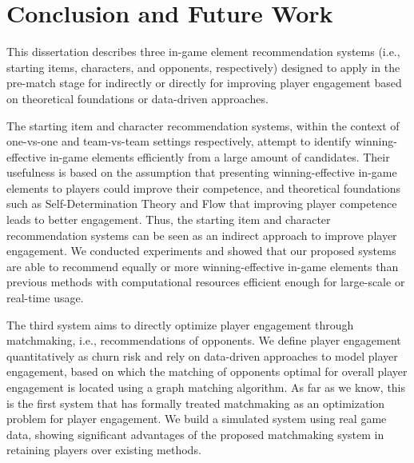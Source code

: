 \chapter{Conclusion and Future Work} %

\label{chapter:conclusion} 

This dissertation describes three in-game element recommendation systems (i.e., starting items, characters, and opponents, respectively) designed to apply in the pre-match stage for indirectly or directly for improving player engagement based on theoretical foundations or data-driven approaches. 

The starting item and character recommendation systems, within the context of one-vs-one and team-vs-team settings respectively, attempt to identify winning-effective in-game elements efficiently from a large amount of candidates. Their usefulness is based on the assumption that presenting winning-effective in-game elements to players could improve their competence, and theoretical foundations such as Self-Determination Theory and Flow that improving player competence leads to better engagement. Thus, the starting item and character recommendation systems can be seen as an indirect approach to improve player engagement. We conducted experiments and showed that our proposed systems are able to recommend equally or more winning-effective in-game elements than previous methods with computational resources efficient enough for large-scale or real-time usage. 

The third system aims to directly optimize player engagement through matchmaking, i.e., recommendations of opponents. We define player engagement quantitatively as churn risk and rely on data-driven approaches to model player engagement, based on which the  matching of opponents optimal for overall player engagement is located using a graph matching algorithm. As far as we know, this is the first system that has formally treated matchmaking as an optimization problem for player engagement. We build a simulated system using real game data, showing significant advantages of the proposed matchmaking system in retaining players over existing methods.



